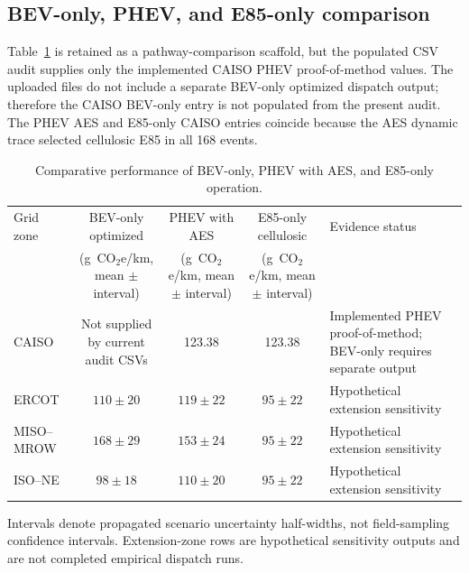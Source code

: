 \documentclass[cleantechnol,article,submit,pdftex,moreauthors]{Definitions/mdpi}
\newcommand{\gcoeqkm}{g~CO$_2$e/km}
\begin{document}
\subsection{BEV-only, PHEV, and E85-only comparison}
\label{subsec:pathway_comparison}

Table~\ref{tab:pathway_comparison} is retained as a pathway-comparison scaffold, but the populated CSV audit supplies only the implemented CAISO PHEV proof-of-method values. The uploaded files do not include a separate BEV-only optimized dispatch output; therefore the CAISO BEV-only entry is not populated from the present audit. The PHEV AES and E85-only CAISO entries coincide because the AES dynamic trace selected cellulosic E85 in all 168 events.

\begin{table}[htbp]
	\centering
	\begin{threeparttable}
		\caption{Comparative performance of BEV-only, PHEV with AES, and E85-only operation.}
		\label{tab:pathway_comparison}
		\scriptsize
		\begin{tabular}{lcccl}
			\toprule
			Grid zone & BEV-only optimized & PHEV with AES & E85-only cellulosic & Evidence status \\
			& (\gcoeqkm{}, mean $\pm$ interval) & (\gcoeqkm{}, mean $\pm$ interval) & (\gcoeqkm{}, mean $\pm$ interval) & \\
			\midrule
			CAISO & Not supplied by current audit CSVs & 123.38 & 123.38 & Implemented PHEV proof-of-method; BEV-only requires separate output \\
			ERCOT & $110\pm20$ & $119\pm22$ & $95\pm22$ & Hypothetical extension sensitivity \\
			MISO--MROW & $168\pm29$ & $153\pm24$ & $95\pm22$ & Hypothetical extension sensitivity \\
			ISO--NE & $98\pm18$ & $110\pm20$ & $95\pm22$ & Hypothetical extension sensitivity \\
			\bottomrule
		\end{tabular}
		\begin{tablenotes}
			\footnotesize
			\item Intervals denote propagated scenario uncertainty half-widths, not field-sampling confidence intervals. Extension-zone rows are hypothetical sensitivity outputs and are not completed empirical dispatch runs.
		\end{tablenotes}
	\end{threeparttable}
\end{table}
\end{document}
